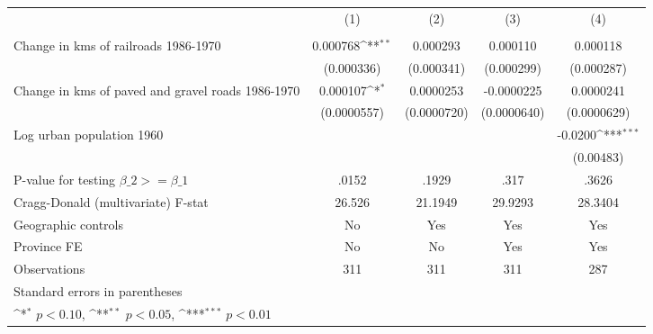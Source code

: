 {
\def\sym#1{\ifmmode^{#1}\else\(^{#1}\)\fi}
\begin{tabular}{l*{4}{c}}
\hline\hline
                &\multicolumn{1}{c}{(1)}&\multicolumn{1}{c}{(2)}&\multicolumn{1}{c}{(3)}&\multicolumn{1}{c}{(4)}\\
                &\multicolumn{1}{c}{}&\multicolumn{1}{c}{}&\multicolumn{1}{c}{}&\multicolumn{1}{c}{}\\
\hline
Change in kms of railroads 1986-1970& 0.000768\sym{**} & 0.000293         & 0.000110         & 0.000118         \\
                &(0.000336)         &(0.000341)         &(0.000299)         &(0.000287)         \\
[1em]
Change in kms of paved and gravel roads 1986-1970& 0.000107\sym{*}  &0.0000253         &-0.0000225         &0.0000241         \\
                &(0.0000557)         &(0.0000720)         &(0.0000640)         &(0.0000629)         \\
[1em]
Log urban population 1960&                  &                  &                  &  -0.0200\sym{***}\\
                &                  &                  &                  &(0.00483)         \\
\hline
P-value for testing $\beta\_{2} >= \beta\_{1}$&    .0152         &    .1929         &     .317         &    .3626         \\
Cragg-Donald (multivariate) F-stat&   26.526         &  21.1949         &  29.9293         &  28.3404         \\
Geographic controls&       No         &      Yes         &      Yes         &      Yes         \\
Province FE     &       No         &       No         &      Yes         &      Yes         \\
Observations    &      311         &      311         &      311         &      287         \\
\hline\hline
\multicolumn{5}{l}{\footnotesize Standard errors in parentheses}\\
\multicolumn{5}{l}{\footnotesize \sym{*} \(p<0.10\), \sym{**} \(p<0.05\), \sym{***} \(p<0.01\)}\\
\end{tabular}
}
